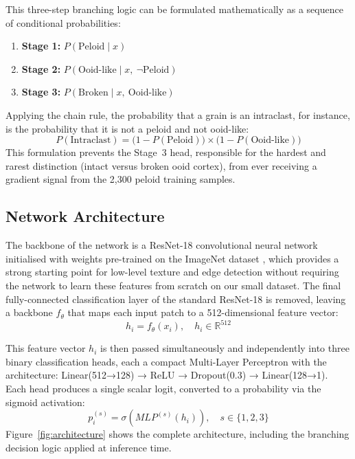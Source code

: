 \documentclass[a4paper,fleqn]{cas-dc}
\begin{document}
This three-step branching logic can be formulated mathematically as a sequence of conditional probabilities:
\begin{enumerate}
  \item \textbf{Stage 1:} $P(\text{Peloid} \mid x)$
  \item \textbf{Stage 2:} $P(\text{Ooid-like} \mid x,\ \neg\text{Peloid})$
  \item \textbf{Stage 3:} $P(\text{Broken} \mid x,\ \text{Ooid-like})$
\end{enumerate}
Applying the chain rule, the probability that a grain is an intraclast, for instance, is the probability that it is not a peloid and not ooid-like:
\begin{equation}
P(\text{Intraclast}) = \bigl(1 - P(\text{Peloid})\bigr) \times \bigl(1 - P(\text{Ooid-like})\bigr)
\end{equation}
This formulation prevents the Stage~3 head, responsible for the hardest and rarest distinction (intact versus broken ooid cortex), from ever receiving a gradient signal from the 2,300 peloid training samples.

\subsection{Network Architecture}
The backbone of the network is a ResNet-18 convolutional neural network \citep{he2016resnet} initialised with weights pre-trained on the ImageNet dataset \citep{russakovsky2015imagenet}, which provides a strong starting point for low-level texture and edge detection without requiring the network to learn these features from scratch on our small dataset. The final fully-connected classification layer of the standard ResNet-18 is removed, leaving a backbone $f_\theta$ that maps each input patch to a 512-dimensional feature vector:
\begin{equation}
h_i = f_\theta(x_i), \quad h_i \in \mathbb{R}^{512}
\end{equation}

This feature vector $h_i$ is then passed simultaneously and independently into three binary classification heads, each a compact Multi-Layer Perceptron with the architecture: Linear(512→128) → ReLU → Dropout(0.3) \citep{srivastava2014dropout} → Linear(128→1). Each head produces a single scalar logit, converted to a probability via the sigmoid activation:
\begin{equation}
p_i^{(s)} = \sigma\!\left(MLP^{(s)}(h_i)\right), \quad s \in \{1,2,3\}
\end{equation}
Figure~\ref{fig:architecture} shows the complete architecture, including the branching decision logic applied at inference time.
\end{document}
